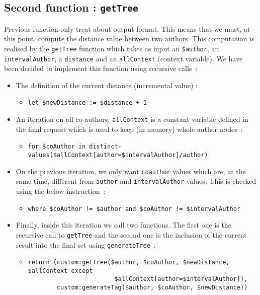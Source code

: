 \documentclass{article}
\begin{document}
\subsection{Second function : \texttt{getTree}}
Previous function only treat about output format. This means that we must, at this point, compute the distance value between two authors. This computation is realised by the \verb|getTree| function which takes as input an \verb|$author|, an \verb|intervalAuthor|, a \verb|distance| and an \verb|allContext| (context variable). We have been decided to implement this function using recursive calls~:
\begin{itemize}
\item The definition of the current distance (incremental value) :
\begin{itemize}
\item \verb|let $newDistance := $distance + 1|
\end{itemize}
\item An iteration on all co-authors. \verb|allContext| is a constant variable defined in the final request which is used to keep (in memory) whole author nodes~:
\begin{itemize}
\item \verb|for $coAuthor in distinct-values($allContext[author=$intervalAuthor]/author)|
\end{itemize}
\item On the previous iteration, we only want \verb|coauthor| values which are, at the same time, different from  \verb|author| and \verb|intervalAuthor| values. This is checked using the below instruction~:
\begin{itemize}
\item \verb|where $coAuthor != $author and $coAuthor != $intervalAuthor|
\end{itemize}
\item Finally, inside this iteration we call two functions. The first one is the recursive call to \verb|getTree| and the second one is the inclusion of the current result into the final set using \verb|generateTree|~: 
\begin{itemize}
\item \begin{verbatim}
return (custom:getTree($author, $coAuthor, $newDistance, $allContext except 
                        $allContext[author=$intervalAuthor]),
        custom:generateTag($author, $coAuthor, $newDistance))
\end{verbatim}
\end{itemize}
\end{itemize}
\end{document}
